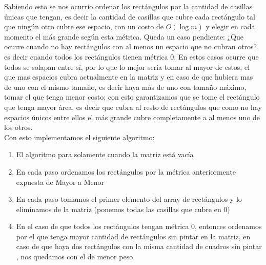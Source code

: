 \documentclass{article}
\begin{document}
Sabiendo esto se nos ocurrio ordenar los rectángulos por la cantidad de casillas únicas que tengan, es decir la cantidad de casillas que cubre cada rectángulo tal que ningún otro cubre ese espacio, con un costo de $O(\log m)$ y elegir en cada momento el más grande según esta métrica. Queda un caso pendiente: ¿Que ocurre cuando no hay rectángulos con al menos un espacio que no cubran otros?, es decir cuando todos los rectángulos tienen métrica 0. En estos casos ocurre que todos se solapan entre sí, por lo que lo mejor sería tomar al mayor de estos, el que mas espacios cubra actualmente en la matriz y en caso de que hubiera mas de uno con el mismo tamaño, es decir haya más de uno con tamaño máximo, tomar el que tenga menor costo; con esto garantizamos que se tome el rectángulo que tenga mayor área, es decir que cubra al resto de rectángulos que como no hay espacios únicos entre ellos el más grande cubre completamente a al menos uno de los otros.\\


Con esto implementamos el siguiente algoritmo:

\begin{enumerate}
    \item El algoritmo para solamente cuando la matriz está vacía 
    \item En cada paso ordenamos los rectángulos por la métrica anteriormente expuesta de Mayor a Menor
    \item En cada paso tomamos el primer elemento del array de rectángulos y lo eliminamos de la matriz (ponemos todas las casillas que cubre en 0)
    \item En el caso de que todos los rectángulos tengan métrica 0, entonces ordenamos por el que tenga mayor cantidad de rectángulos sin pintar en la matriz, en caso de que haya dos rectángulos con la misma cantidad de cuadros sin pintar , nos quedamos con el de menor peso 
\end{enumerate}
\end{document}
